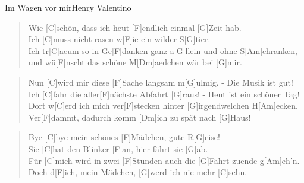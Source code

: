 \begin{song}{Im Wagen vor mir}{Henry Valentino}

    \begin{verse}
        Wie [C]schön, dass ich heut [F]endlich einmal [G]Zeit hab. \\
        Ich [C]muss nicht rasen w[F]ie ein wilder S[G]tier. \\
        Ich tr[C]aeum so in Ge[F]danken ganz a[G]llein und ohne S[Am]chranken, \\ %
        und wü[F]nscht das schöne M[Dm]aedchen wär bei [G]mir. %
    \end{verse}

    \begin{verse}
        Nun [C]wird mir diese [F]Sache langsam m[G]ulmig. - Die Musik ist gut! \\
        Ich [C]fahr die aller[F]nächste Abfahrt [G]raus! - Heut ist ein schöner Tag! \\
        Dort w[C]erd ich mich ver[F]stecken hinter [G]irgendwelchen H[Am]ecken. \\
        Ver[F]dammt, dadurch komm [Dm]ich zu spät nach [G]Haus!
    \end{verse}

    \begin{verse}
        Bye [C]bye mein schönes [F]Mädchen, gute R[G]eise! \\
        Sie [C]hat den Blinker [F]an, hier fährt sie [G]ab. \\
        Für [C]mich wird in zwei [F]Stunden auch die [G]Fahrt zuende g[Am]eh'n. \\
        Doch d[F]ich, mein Mädchen, [G]werd ich nie mehr [C]sehn.
    \end{verse}


\end{song}
